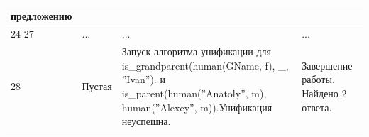 \documentclass[12pt]{report}
\begin{document}
\begin{table}[H]
\begin{center}
\begin{tabular}{|p{1 cm}|p{5 cm}|p{8.5 cm}|p{4 cm}|}
			предложению  \\
			\hline 
			24-27 & ... & ... & ... \\
			\hline 
			28 & Пустая &
			Запуск алгоритма унификации для is\_grandparent(human(GName, f), \_, ''Ivan'').
			и is\_parent(human(''Anatoly'', m), human(''Alexey'', m)).\newline Унификация неуспешна. & Завершение работы. Найдено 2
			ответа. \\
			\hline 
		\end{tabular}
	\end{center}
\end{table}
\end{document}
